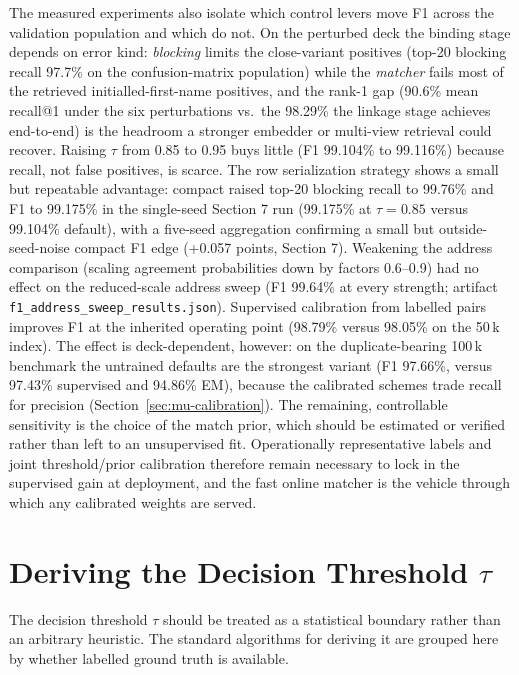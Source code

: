 \documentclass[11pt]{article}
\begin{document}
The measured experiments also isolate which control levers move F1 across the validation population and which do not. On the perturbed deck the binding stage depends on error kind: \emph{blocking} limits the close-variant positives (top-20 blocking recall 97.7\% on the confusion-matrix population) while the \emph{matcher} fails most of the retrieved initialled-first-name positives, and the rank-1 gap (90.6\% mean recall@1 under the six perturbations vs.\ the 98.29\% the linkage stage achieves end-to-end) is the headroom a stronger embedder or multi-view retrieval could recover. Raising $\tau$ from 0.85 to 0.95 buys little (F1 99.104\% to 99.116\%) because recall, not false positives, is scarce. The row serialization strategy shows a small but repeatable advantage: compact raised top-20 blocking recall to 99.76\% and F1 to 99.175\% in the single-seed Section 7 run (99.175\% at $\tau{=}0.85$ versus 99.104\% default), with a five-seed aggregation confirming a small but outside-seed-noise compact F1 edge (+0.057 points, Section 7). Weakening the address comparison (scaling agreement probabilities down by factors 0.6--0.9) had no effect on the reduced-scale address sweep (F1 99.64\% at every strength; artifact \texttt{f1\_address\_sweep\_results.json}). Supervised calibration from labelled pairs improves F1 at the inherited operating point (98.79\% versus 98.05\% on the 50\,k index). The effect is deck-dependent, however: on the duplicate-bearing 100\,k benchmark the untrained defaults are the strongest variant (F1 97.66\%, versus 97.43\% supervised and 94.86\% EM), because the calibrated schemes trade recall for precision (Section~\ref{sec:mu-calibration}). The remaining, controllable sensitivity is the choice of the match prior, which should be estimated or verified rather than left to an unsupervised fit. Operationally representative labels and joint threshold/prior calibration therefore remain necessary to lock in the supervised gain at deployment, and the fast online matcher is the vehicle through which any calibrated weights are served.

\appendix
\section{Deriving the Decision Threshold $\tau$}
\label{app:derive-tau}
The decision threshold $\tau$ should be treated as a statistical boundary rather than an arbitrary heuristic. The standard algorithms for deriving it are grouped here by whether labelled ground truth is available.
\end{document}

